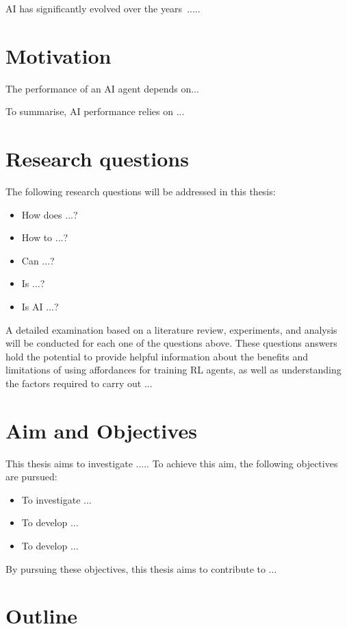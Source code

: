 \ac{AI} has significantly evolved over the years~\cite{shao2019survey}.....

\section{Motivation}

The performance of an \ac{AI} agent depends on...


To summarise, \ac{AI} performance relies on ...

\section{Research questions}

The following research questions will be addressed in this thesis:

\begin{itemize}
    \item How does ...?
    \item How to ...?
    \item Can ...?
    \item Is ...?
    \item Is \ac{AI} ...?
\end{itemize}

A detailed examination based on a literature review, experiments, and analysis will be conducted for each one of the questions above. These questions answers hold the potential to provide helpful information about the benefits and limitations of using affordances for training RL agents, as well as understanding the factors required to carry out ... 

\section{Aim and Objectives}

This thesis aims to investigate ..... To achieve this aim, the following objectives are pursued: 

\begin{itemize}
    \item To investigate ...
    \item To develop ...
    \item To develop ...
\end{itemize}

By pursuing these objectives, this thesis aims to contribute to ...

\section{Outline}


